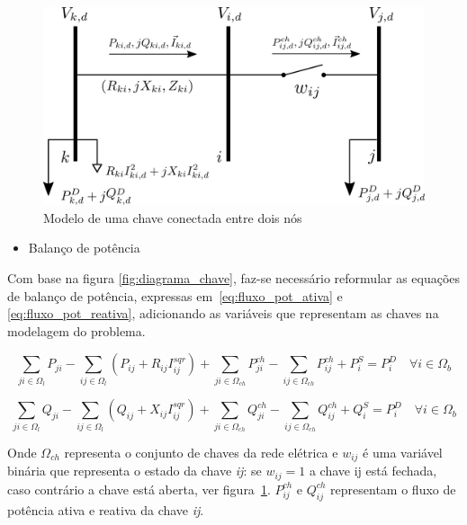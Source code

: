 \begin{figure}[H]
    \centering
    \includegraphics[scale = 1.3]{4_Modeling/diagrama_chaves.png}
    \caption{Modelo de uma chave conectada entre dois nós}
    \label{fig:diagrama_chave}
\end{figure}
    
\begin{itemize}
    \item Balanço de potência
\end{itemize}
    Com base na figura \eqref{fig:diagrama_chave}, faz-se necessário reformular as equações de balanço de potência, expressas em~\eqref{eq:fluxo_pot_ativa} e \eqref{eq:fluxo_pot_reativa}, adicionando as variáveis que representam as chaves na modelagem do problema.

\begin{equation}
    \sum_{ji\in\Omega_{l}}P_{ji} - \sum_{ij\in\Omega_{l}}(P_{ij} + R_{ij}I_{ij}^{sqr})+ \sum_{ji\in\Omega_{ch}}P_{ji}^{ch} -\sum_{ij\in\Omega_{ch}}P_{ij}^{ch} + P_{i}^{S} = P_{i}^{D}\quad\forall i \in\Omega_{b}\label{eq:fluxo_pot_ativa_chaves}  
\end{equation}
    
    
\begin{equation}
    \sum_{ji\in\Omega_{l}}Q_{ji} - \sum_{ij\in\Omega_{l}}(Q_{ij} + X_{ij}I_{ij}^{sqr})+ \sum_{ji\in\Omega_{ch}}Q_{ji}^{ch} -\sum_{ij\in\Omega_{ch}}Q_{ij}^{ch} + Q_{i}^{S} = P_{i}^{D}\quad\forall i \in\Omega_{b}
    \label{eq:fluxo_pot_reativa_chaves}
\end{equation}
    
Onde $\Omega_{ch}$ representa o conjunto de chaves da rede elétrica e $w_{ij}$ é uma variável binária que representa o estado da chave \textit{ij}: se $w_{ij} = 1$ a chave ij está fechada, caso contrário a chave está aberta, ver figura~\ref{fig:diagrama_chave}. $P_{ij}^{ch}$ e $Q_{ij}^{ch}$ representam o fluxo de potência ativa e reativa da chave \textit{ij}.

